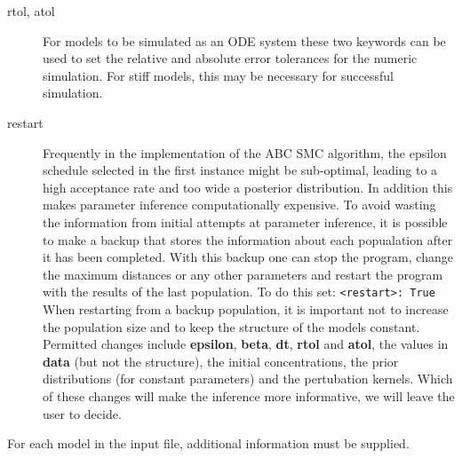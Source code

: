 \documentclass[a4paper]{report}
\begin{document}
\begin{description}
\item[rtol, atol] For models to be simulated as an ODE system these two keywords can be used to set the relative and absolute error tolerances for the numeric simulation. For stiff models, this may be necessary for successful simulation.
\item[restart] Frequently in the implementation of the ABC SMC algorithm, the epsilon schedule selected in the first instance might be sub-optimal, leading to a high acceptance rate and too wide a posterior distribution. In addition this makes parameter inference computationally expensive. To avoid wasting the information from initial attempts at parameter inference, it is possible to make a backup that stores the information about each popualation after it has been completed. With this backup one can stop the program, change the maximum distances or any other parameters and restart the program with the results of the last population. To do this set: \verb$<restart>: True$ When restarting from a backup population, it is important not to increase the population size and to keep the structure of the models constant. Permitted changes include \textbf{epsilon}, \textbf{beta}, \textbf{dt}, \textbf{rtol} and \textbf{atol}, the values in \textbf{data} (but not the structure), the initial concentrations, the prior distributions (for constant parameters) and the pertubation kernels. Which of these changes will make the inference more informative, we will leave the user to decide.\end{description}
For each model in the input file, additional information must be supplied.
\end{document}
